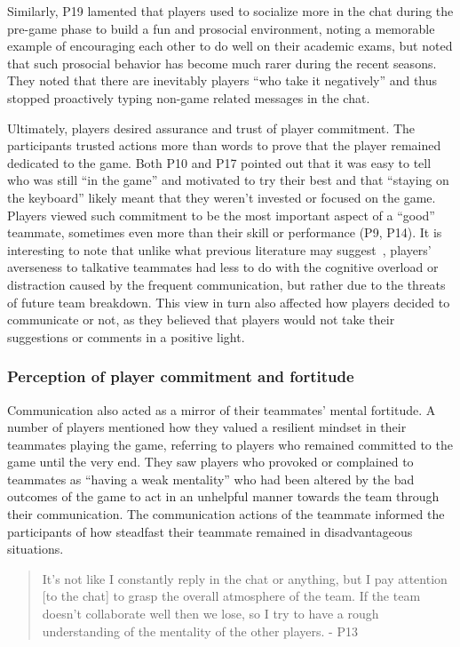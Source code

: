 Similarly, P19 lamented that players used to socialize more in the chat during the pre-game phase to build a fun and prosocial environment, noting a memorable example of encouraging each other to do well on their academic exams, but noted that such prosocial behavior has become much rarer during the recent seasons. They noted that there are inevitably players ``who take it negatively'' and thus stopped proactively typing non-game related messages in the chat.

Ultimately, players desired assurance and trust of player commitment. The participants trusted actions more than words to prove that the player remained dedicated to the game. Both P10 and P17 pointed out that it was easy to tell who was still ``in the game'' and motivated to try their best and that ``staying on the keyboard'' likely meant that they weren't invested or focused on the game. Players viewed such commitment to be the most important aspect of a ``good'' teammate, sometimes even more than their skill or performance (P9, P14). It is interesting to note that unlike what previous literature may suggest~\cite{marlow2018}, players' averseness to talkative teammates had less to do with the cognitive overload or distraction caused by the frequent communication, but rather due to the threats of future team breakdown. This view in turn also affected how players decided to communicate or not, as they believed that players would not take their suggestions or comments in a positive light. 


\subsubsection{Perception of player commitment and fortitude}

Communication also acted as a mirror of their teammates' mental fortitude. A number of players mentioned how they valued a resilient mindset in their teammates playing the game, referring to players who remained committed to the game until the very end. They saw players who provoked or complained to teammates as ``having a weak mentality'' who had been altered by the bad outcomes of the game to act in an unhelpful manner towards the team through their communication. The communication actions of the teammate informed the participants of how steadfast their teammate remained in disadvantageous situations.  

\begin{quote}
It's not like I constantly reply in the chat or anything, but I pay attention [to the chat] to grasp the overall atmosphere of the team. If the team doesn't collaborate well then we lose, so I try to have a rough understanding of the mentality of the other players. - P13
\end{quote}


